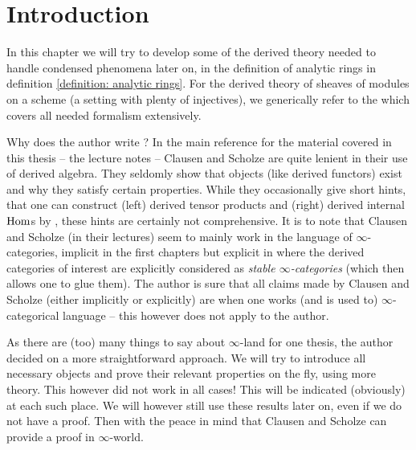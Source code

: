 
\section*{Introduction}

In this chapter we will try to develop some of the derived theory needed to handle condensed phenomena later on, \eg in the definition of analytic rings in definition \ref{definition: analytic rings}. For the derived theory of sheaves of modules on a scheme (a setting with plenty of injectives), we generically refer to the \cite[The Stacks Project]{stacks-project} which covers all needed formalism extensively.

Why does the author write ? In the main reference for the material covered in this thesis -- the lecture notes \cite{condenseddotpdf} -- Clausen and Scholze are quite lenient in their use of derived algebra. They seldomly show that objects (like derived functors) exist and why they satisfy certain properties. While they occasionally give short hints, \eg that one can construct (left) derived tensor products and (right) derived internal ${\operatorname{Hom}}$s by  \cite[p. 13 (iii)]{condenseddotpdf}, these hints are certainly not comprehensive. It is to note that Clausen and Scholze (in their lectures) seem to mainly work in the language of $\infty$-categories, implicit in the first chapters but explicit in \cite[Lectures IX, X \& XI]{condenseddotpdf} where the derived categories of interest are explicitly considered as \emph{stable $\infty$-categories} (which then allows one to glue them). The author is sure that all claims made by Clausen and Scholze (either implicitly or explicitly) are  when one works (and is used to) $\infty$-categorical language -- this however does not apply to the author. 

As there are (too) many things to say about $\infty$-land for one thesis, the author decided on a more straightforward approach. We will try to introduce all necessary objects and prove their relevant properties on the fly, using more  theory. This however did not work in all cases! This will be indicated (obviously) at each such place. We will however still use these results later on, even if we do not have a proof. Then with the peace in mind that Clausen and Scholze can provide a proof in $\infty$-world.

